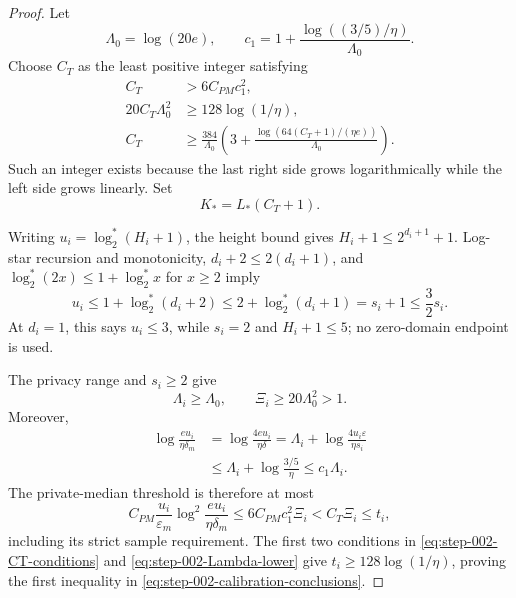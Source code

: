 \begin{proof}
Let
\[
\Lambda_0=\log(20e),\qquad
c_1=1+\frac{\log((3/5)/\eta)}{\Lambda_0}.
\]
Choose \(C_T\) as the least positive integer satisfying
\begin{equation}\label{eq:step-002-CT-conditions}
\begin{split}
C_T&>6C_{PM}c_1^2,\\
20C_T\Lambda_0^2&\ge128\log(1/\eta),\\
C_T&\ge\frac{384}{\Lambda_0}
\left(3+\frac{\log(64(C_T+1)/(\eta e))}{\Lambda_0}\right).
\end{split}
\end{equation}
Such an integer exists because the last right side grows logarithmically
while the left side grows linearly.  Set
\begin{equation}\label{eq:step-002-Kstar}
K_*=L_*(C_T+1).
\end{equation}

Writing \(u_i=\log_2^*(H_i+1)\), the height bound gives
\(H_i+1\le2^{d_i+1}+1\).  Log-star recursion and monotonicity,
\(d_i+2\le2(d_i+1)\), and
\(\log_2^*(2x)\le1+\log_2^*x\) for \(x\ge2\) imply
\begin{equation}\label{eq:step-002-height-logstar}
u_i\le1+\log_2^*(d_i+2)
\le2+\log_2^*(d_i+1)=s_i+1\le\frac32s_i.
\end{equation}
At \(d_i=1\), this says \(u_i\le3\), while \(s_i=2\) and
\(H_i+1\le5\); no zero-domain endpoint is used.

The privacy range and \(s_i\ge2\) give
\begin{equation}\label{eq:step-002-Lambda-lower}
\Lambda_i\ge\Lambda_0,\qquad
\Xi_i\ge20\Lambda_0^2>1.
\end{equation}
Moreover,
\begin{equation}\label{eq:step-002-median-log}
\begin{split}
\log\frac{eu_i}{\eta\delta_m}
&=\log\frac{4eu_i}{\eta\delta}
=\Lambda_i+\log\frac{4u_i\varepsilon}{\eta s_i}\\
&\le\Lambda_i+\log\frac{3/5}{\eta}
\le c_1\Lambda_i.
\end{split}
\end{equation}
The private-median threshold is therefore at most
\begin{equation}\label{eq:step-002-median-threshold}
C_{PM}\frac{u_i}{\varepsilon_m}
\log^2\frac{eu_i}{\eta\delta_m}
\le6C_{PM}c_1^2\Xi_i<C_T\Xi_i\le t_i,
\end{equation}
including its strict sample requirement.  The first two conditions in
\eqref{eq:step-002-CT-conditions} and
\eqref{eq:step-002-Lambda-lower} give
\(t_i\ge128\log(1/\eta)\), proving the first inequality in
\eqref{eq:step-002-calibration-conclusions}.


\end{proof}
